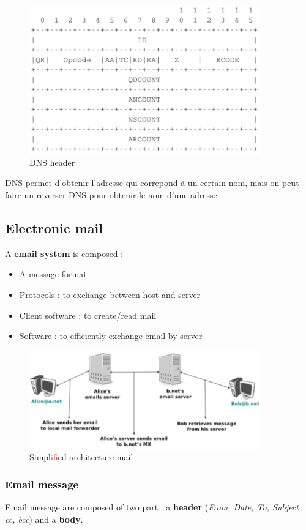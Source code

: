 \begin{figure}[h]
    \centering
    \includegraphics[width=10cm]{dnsheader.png}
    \caption{DNS header}
\end{figure}

DNS permet d'obtenir l'adresse qui correpond à un certain nom, mais on peut
faire un reverser DNS pour obtenir le nom d'une adresse.

\subsection{Electronic mail}

A \textbf{email system} is composed :
\begin{itemize}
    \item A message format
    \item Protocols : to exchange between host and server
    \item Client software : to create/read mail
    \item Software : to efficiently exchange email by server
\end{itemize}
 
\begin{figure}[h]
    \centering
    \includegraphics[width=10cm]{mail.png}
    \caption{Simpl\textcolor{red}{if}ied architecture mail}
\end{figure}

\subsubsection{Email message}
Email message are composed of two part : a \textbf{header} (\textit{From, Date, To, Subject,  cc, bcc}) and a \textbf{body}.

